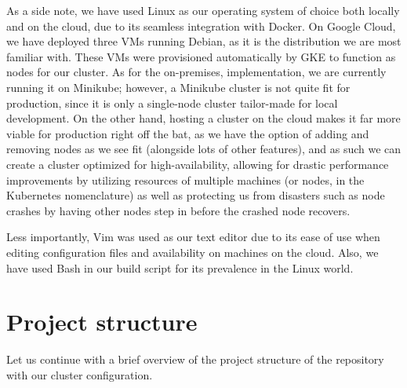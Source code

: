 \documentclass[thesis=B,english]{FITthesis}[2019/12/23]
\begin{document}
As a side note, we have used Linux as our operating system of choice both locally and on the cloud, due to its seamless integration with Docker. On Google Cloud, we have deployed three VMs running Debian, as it is the distribution we are most familiar with. These VMs were provisioned automatically by GKE to function as nodes for our cluster. As for the on-premises, implementation, we are currently running it on Minikube; however, a Minikube cluster is not quite fit for production, since it is only a single-node cluster tailor-made for local development. On the other hand, hosting a cluster on the cloud makes it far more viable for production right off the bat, as we have the option of adding and removing nodes as we see fit (alongside lots of other features), and as such we can create a cluster optimized for high-availability, allowing for drastic performance improvements by utilizing resources of multiple machines (or nodes, in the Kubernetes nomenclature) as well as protecting us from disasters such as node crashes by having other nodes step in before the crashed node recovers. \cite{high-availability}

Less importantly,  Vim was used as our text editor due to its ease of use when editing configuration files and availability on machines on the cloud. Also, we have used Bash in our build script for its prevalence in the Linux world.


\section{Project structure}

Let us continue with a brief overview of the project structure of the repository with our cluster configuration.
\end{document}
